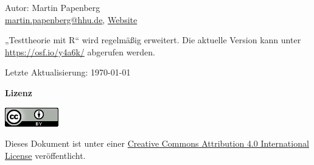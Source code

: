 
\clearpage

\Large

\noindent Autor: Martin Papenberg \\

\noindent 
\href{mailto:martin.papenberg@hhu.de}{martin.papenberg@hhu.de},
\href{http://www.psychologie.hhu.de/arbeitsgruppen/diagnostik-und-differentielle-psychologie/arbeitsgruppe/martin-papenberg.html}{Website}
\\

\vspace{1cm}

\noindent „Testtheorie mit R“ wird regelmäßig erweitert. Die aktuelle Version kann unter
\href{https://osf.io/y4a6k/}{https://osf.io/y4a6k/} abgerufen werden. \\

\vspace{0.3cm}

\noindent Letzte Aktualisierung: \today

\vspace{2cm}

\noindent \textbf{Lizenz}

\vspace{0.3cm}

\noindent \includegraphics[width=88px]{./licence.png}

\vspace{0.2cm}

\noindent Dieses Dokument ist unter einer
\href{http://creativecommons.org/licenses/by/4.0/}{Creative Commons
  Attribution 4.0 International License} veröffentlicht.

\normalsize
